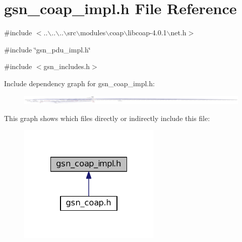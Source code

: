 \hypertarget{a00479}{
\section{gsn\_\-coap\_\-impl.h File Reference}
\label{a00479}
}
{\ttfamily \#include $<$..$\backslash$..$\backslash$..$\backslash$src$\backslash$modules$\backslash$coap$\backslash$libcoap-\/4.0.1$\backslash$net.h$>$}\par
{\ttfamily \#include \char`\"{}gsn\_\-pdu\_\-impl.h\char`\"{}}\par
{\ttfamily \#include $<$gsn\_\-includes.h$>$}\par
Include dependency graph for gsn\_\-coap\_\-impl.h:
\nopagebreak
\begin{figure}[H]
\begin{center}
\leavevmode
\includegraphics[width=400pt]{a00704}
\end{center}
\end{figure}
This graph shows which files directly or indirectly include this file:
\nopagebreak
\begin{figure}[H]
\begin{center}
\leavevmode
\includegraphics[width=192pt]{a00705}
\end{center}
\end{figure}
